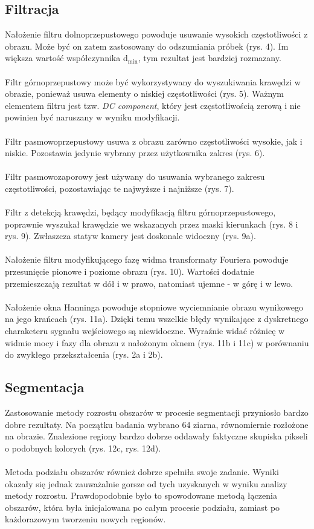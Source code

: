 \documentclass{classrep}
\begin{document}
\subsection{Filtracja}
Nałożenie filtru dolnoprzepustowego powoduje usuwanie wysokich częstotliwości z obrazu. Może być on zatem zastosowany do odszumiania próbek (rys. 4). Im większa wartość współczynnika d$_{\text{min}}$, tym rezultat jest bardziej rozmazany.\\
\\
\indent
Filtr górnoprzepustowy może być wykorzystywany do wyszukiwania krawędzi w obrazie, ponieważ usuwa elementy o niskiej częstotliwości (rys. 5). Ważnym elementem filtru jest tzw. \textit{DC component}, który jest częstotliwością zerową i nie powinien być naruszany w wyniku modyfikacji.\\
\\
\indent
Filtr pasmowoprzepustowy usuwa z obrazu zarówno częstotliwości wysokie, jak i niskie. Pozostawia jedynie wybrany przez użytkownika zakres (rys. 6).\\
\\
\indent
Filtr pasmowozaporowy jest używany do usuwania wybranego zakresu częstotliwości, pozostawiając te najwyższe i najniższe (rys. 7).\\
\\
\indent
Filtr z detekcją krawędzi, będący modyfikacją filtru górnoprzepustowego, poprawnie wyszukał krawędzie we wskazanych przez maski kierunkach (rys. 8 i rys. 9). Zwłaszcza statyw kamery jest doskonale widoczny (rys. 9a).\\
\\
\indent
Nałożenie filtru modyfikującego fazę widma transformaty Fouriera powoduje przesunięcie pionowe i poziome obrazu (rys. 10). Wartości dodatnie przemieszczają rezultat w dół i w prawo, natomiast ujemne - w górę i w lewo.\\
\\
\indent
Nałożenie okna Hanninga powoduje stopniowe wyciemnianie obrazu wynikowego na jego krańcach (rys. 11a). Dzięki temu wszelkie błędy wynikające z dyskretnego charaketeru sygnału wejściowego są niewidoczne. Wyraźnie widać różnicę w widmie mocy i fazy dla obrazu z nałożonym oknem (rys. 11b i 11c) w porównaniu do zwykłego przekształcenia (rys. 2a i 2b).

\subsection{Segmentacja}
Zastosowanie metody rozrostu obszarów w procesie segmentacji przyniosło bardzo dobre rezultaty. Na początku badania wybrano 64 ziarna, równomiernie rozłożone na obrazie. Znalezione regiony bardzo dobrze oddawały faktyczne skupiska pikseli o podobnych kolorych (rys. 12c, rys. 12d).\\
\\
\indent
Metoda podziału obszarów również dobrze spełniła swoje zadanie. Wyniki okazały się jednak zauważalnie gorsze od tych uzyskanych w wyniku analizy metody rozrostu. Prawdopodobnie było to spowodowane metodą łączenia obszarów, która była inicjalowana po całym procesie podziału, zamiast po każdorazowym tworzeniu nowych regionów. 
\end{document}
